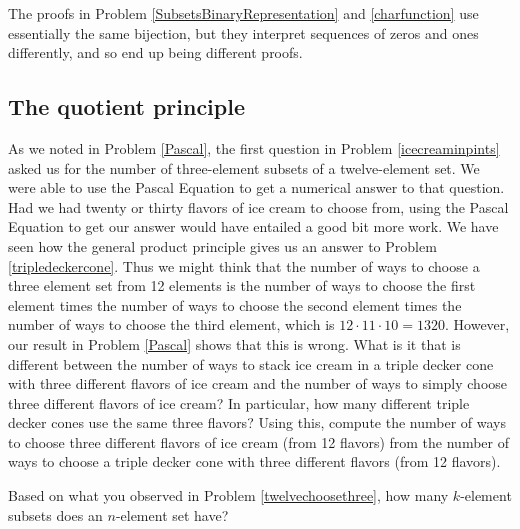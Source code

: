 The proofs in Problem \ref{SubsetsBinaryRepresentation} and
\ref{charfunction} use essentially the same bijection, but they interpret
sequences of zeros and ones differently, and so end up being different proofs.


\subsection{The quotient principle}

\bp
\iteme As we noted in Problem \ref{Pascal}, the first question in
Problem \ref{icecreaminpints} asked us for the number of three-element
subsets of a twelve-element set.  We were able to use the Pascal Equation to
get a numerical answer to that question.  Had we had twenty or thirty flavors
of ice cream to choose from, using the Pascal Equation to get our answer
would have entailed a good bit more work. We have seen how the general
product principle gives us an answer to Problem \ref{tripledeckercone}.  Thus
we might think that the number of ways to choose a three element set from 12
elements is the number of ways to choose the first element times the number
of ways to choose the second element times the number of ways to choose the
third element, which is $12\cdot11\cdot10=1320$.  However, our result in
Problem \ref{Pascal} shows that this is wrong.  What is it that is different
between the number of ways to stack ice cream in  a triple decker cone with
three different flavors of ice cream and the number of ways to simply choose
three different flavors of ice cream?  In particular, how many different
triple decker cones use the same three flavors?  Using this, compute the
number of ways to choose three different flavors of ice cream (from 12
flavors) from the number of ways to choose a triple decker cone with three
different flavors (from 12 flavors).\label{twelvechoosethree}

\iteme  Based on what you observed in Problem
\ref{twelvechoosethree}, how many $k$-element subsets does an
$n$-element set have?\label{nchoosek}

